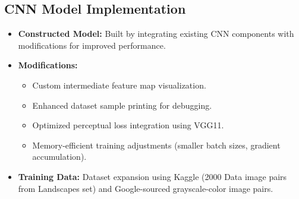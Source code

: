 \documentclass[conference]{IEEEtran}
\begin{document}
\subsection{CNN Model Implementation}
\begin{itemize}
    \item \textbf{Constructed Model:} Built by integrating existing CNN components with modifications for improved performance.
    \item \textbf{Modifications:}
    \begin{itemize}
        \item Custom intermediate feature map visualization.
        \item Enhanced dataset sample printing for debugging.
        \item Optimized perceptual loss integration using VGG11.
        \item Memory-efficient training adjustments (smaller batch sizes, gradient accumulation).
    \end{itemize}
    \item \textbf{Training Data:} Dataset expansion using Kaggle (2000 Data image pairs from Landscapes set) and Google-sourced grayscale-color image pairs.
\end{itemize}
\end{document}

